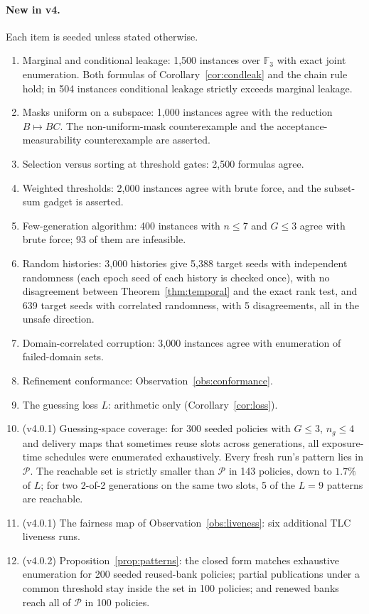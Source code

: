 \documentclass[pdflatex,sn-mathphys-num,twocolumn]{sn-jnl}
\theoremstyle{plain}
\theoremstyle{definition}
\newcommand{\F}{\mathbb{F}}
\begin{document}
\paragraph{New in v4.}
Each item is seeded unless stated otherwise.
\begin{enumerate}
\item Marginal and conditional leakage: 1,500 instances over $\F_3$ with exact joint enumeration. Both formulas of Corollary~\ref{cor:condleak} and the chain rule hold; in 504 instances conditional leakage strictly exceeds marginal leakage.
\item Masks uniform on a subspace: 1,000 instances agree with the reduction $B\mapsto BC$. The non-uniform-mask counterexample and the acceptance-measurability counterexample are asserted.
\item Selection versus sorting at threshold gates: 2,500 formulas agree.
\item Weighted thresholds: 2,000 instances agree with brute force, and the subset-sum gadget is asserted.
\item Few-generation algorithm: 400 instances with $n\le7$ and $G\le3$ agree with brute force; 93 of them are infeasible.
\item Random histories: 3,000 histories give 5,388 target seeds with independent randomness (each epoch seed of each history is checked once), with no disagreement between Theorem~\ref{thm:temporal} and the exact rank test, and 639 target seeds with correlated randomness, with 5 disagreements, all in the unsafe direction.
\item Domain-correlated corruption: 3,000 instances agree with enumeration of failed-domain sets.
\item Refinement conformance: Observation~\ref{obs:conformance}.
\item The guessing loss $L$: arithmetic only (Corollary~\ref{cor:loss}).
\item (v4.0.1) Guessing-space coverage: for 300 seeded policies with $G\le3$, $n_g\le4$ and delivery maps that sometimes reuse slots across generations, all exposure-time schedules were enumerated exhaustively. Every fresh run's pattern lies in $\mathcal P$. The reachable set is strictly smaller than $\mathcal P$ in 143 policies, down to $1.7\%$ of $L$; for two 2-of-2 generations on the same two slots, 5 of the $L=9$ patterns are reachable.
\item (v4.0.1) The fairness map of Observation~\ref{obs:liveness}: six additional TLC liveness runs.
\item (v4.0.2) Proposition~\ref{prop:patterns}: the closed form matches exhaustive enumeration for 200 seeded reused-bank policies; partial publications under a common threshold stay inside the set in 100 policies; and renewed banks reach all of $\mathcal P$ in 100 policies.

\end{enumerate}
\end{document}
